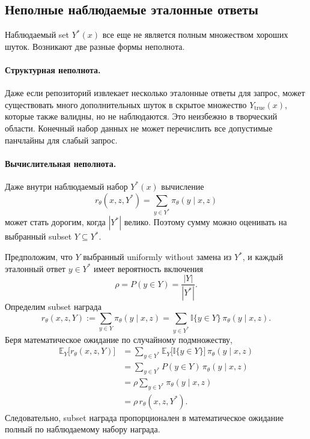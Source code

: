 \subsection{Неполные наблюдаемые эталонные ответы}

Наблюдаемый set \(Y^{*}(x)\) все еще не является полным множеством хороших шуток. Возникают две разные формы неполнота.

\paragraph{Структурная неполнота.}
Даже если репозиторий извлекает несколько эталонные ответы для запрос, может существовать много дополнительных шуток в скрытое множество \(Y_{\mathrm{true}}(x)\), которые также валидны, но не наблюдаются. Это неизбежно в творческий области. Конечный набор данных не может перечислить все допустимые панчлайны для слабый запрос.

\paragraph{Вычислительная неполнота.}
Даже внутри наблюдаемый набор \(Y^{*}(x)\) вычисление
\[
 r_{\theta}(x,z,Y^{*})=\sum_{y\in Y^{*}}\pi_{\theta}(y\mid x,z)
\]
может стать дорогим, когда \(|Y^{*}|\) велико. Поэтому сумму можно оценивать на выбранный subset \(Y\subseteq Y^{*}\).

Предположим, что \(Y\) выбранный uniformly without замена из \(Y^{*}\), и каждый эталонный ответ \(y\in Y^{*}\) имеет вероятность включения
\[
 \rho = P(y\in Y)=\frac{|Y|}{|Y^{*}|}.
\]
Определим subset награда
\[
 r_{\theta}(x,z,Y)
 :=
 \sum_{y\in Y}\pi_{\theta}(y\mid x,z)
 =
 \sum_{y\in Y^{*}}
 \mathbb{I}\{y\in Y\}\,\pi_{\theta}(y\mid x,z).
\]
Беря математическое ожидание по случайному подмножеству,
\begin{align*}
 \mathbb{E}_{Y}\big[r_{\theta}(x,z,Y)\big]
 & =
 \sum_{y\in Y^{*}}
 \mathbb{E}_{Y}\big[\mathbb{I}\{y\in Y\}\big]\,
 \pi_{\theta}(y\mid x,z) \\
 & =
 \sum_{y\in Y^{*}}
 P(y\in Y)\,\pi_{\theta}(y\mid x,z) \\
 & =
 \rho
 \sum_{y\in Y^{*}}\pi_{\theta}(y\mid x,z) \\
 & =
 \rho\,r_{\theta}(x,z,Y^{*}).
\end{align*}
Следовательно, subset награда пропорционален в математическое ожидание полный по наблюдаемому набору награда.

